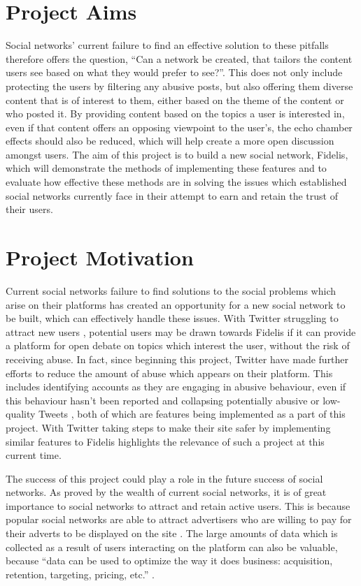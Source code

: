 \section{Project Aims}
Social networks' current failure to find an effective solution to these pitfalls therefore offers the question, ``Can a network be created, that tailors the content users see based on what they would prefer to see?''. This does not only include protecting the users by filtering any abusive posts, but also offering them diverse content that is of interest to them, either based on the theme of the content or who posted it. By providing content based on the topics a user is interested in, even if that content offers an opposing viewpoint to the user's, the echo chamber effects should also be reduced, which will help create a more open discussion amongst users. The aim of this project is to build a new social network, Fidelis, which will demonstrate the methods of implementing these features and to evaluate how effective these methods are in solving the issues which established social networks currently face in their attempt to earn and retain the trust of their users.

\section{Project Motivation}
Current social networks failure to find solutions to the social problems which arise on their platforms has created an opportunity for a new social network to be built, which can effectively handle these issues. With Twitter struggling to attract new users \cite{Barrons:Twitter}, potential users may be drawn towards Fidelis if it can provide a platform for open debate on topics which interest the user, without the risk of receiving abuse. In fact, since beginning this project, Twitter have made further efforts to reduce the amount of abuse which appears on their platform. This includes identifying accounts as they are engaging in abusive behaviour, even if this behaviour hasn't been reported and collapsing potentially abusive or low-quality Tweets \cite{Twitter:Safety}, both of which are features being implemented as a part of this project. With Twitter taking steps to make their site safer by implementing similar features to Fidelis highlights the relevance of such a project at this current time.

The success of this project could play a role in the future success of social networks. As proved by the wealth of current social networks, it is of great importance to social networks to attract and retain active users. This is because popular social networks are able to attract advertisers who are willing to pay for their adverts to be displayed on the site \cite{Investopedia:Adverts}. The large amounts of data which is collected as a result of users interacting on the platform can also be valuable, because ``data can be used to optimize the way it does business: acquisition, retention, targeting, pricing, etc.'' \cite{TechCrunch:Data}.

